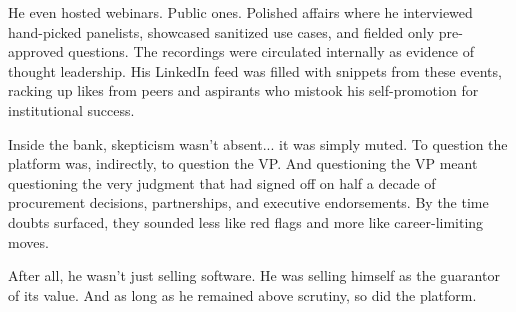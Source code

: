 He even hosted webinars. Public ones. Polished affairs where he interviewed hand-picked panelists, showcased sanitized use cases, and fielded only pre-approved questions. The recordings were circulated internally as evidence of thought leadership. His LinkedIn feed was filled with snippets from these events, racking up likes from peers and aspirants who mistook his self-promotion for institutional success.

Inside the bank, skepticism wasn’t absent... it was simply muted. To question the platform was, indirectly, to question the VP. And questioning the VP meant questioning the very judgment that had signed off on half a decade of procurement decisions, partnerships, and executive endorsements. By the time doubts surfaced, they sounded less like red flags and more like career-limiting moves.

After all, he wasn’t just selling software. He was selling himself as the guarantor of its value. And as long as he remained above scrutiny, so did the platform.

\medskip


